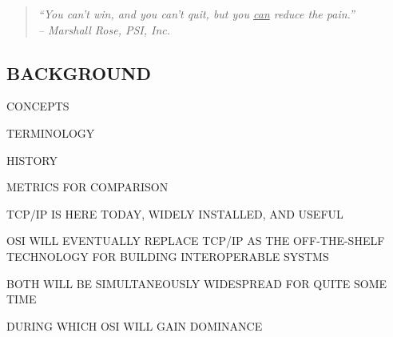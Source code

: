 \begin{bwslide}

\begin{quote}\em
``You can't win, and you can't quit, but you \underline{can} reduce the
pain.''\\ \raggedleft
-- Marshall Rose, PSI, Inc.
\end{quote}
\end{bwslide}


\begin{bwslide}
\part	{BACKGROUND}\bf

\begin{nrtc}
\item	CONCEPTS

\item	TERMINOLOGY

\item	HISTORY

\item	METRICS FOR COMPARISON
\end{nrtc}
\end{bwslide}


\begin{bwslide}

\begin{nrtc}
\item	TCP/IP IS HERE TODAY, WIDELY INSTALLED, AND USEFUL

\item	OSI WILL EVENTUALLY REPLACE TCP/IP AS THE OFF-THE-SHELF TECHNOLOGY FOR
	BUILDING INTEROPERABLE SYSTMS

\item	BOTH WILL BE SIMULTANEOUSLY WIDESPREAD FOR QUITE SOME TIME
    \begin{nrtc}
    \item	DURING WHICH OSI WILL GAIN DOMINANCE
    \end{nrtc}
\end{nrtc}
\end{bwslide}


